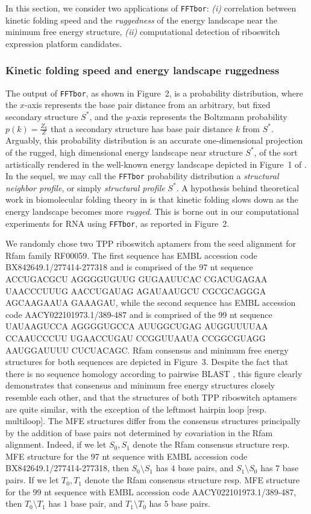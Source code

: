 In this section, we consider two applications of {\tt FFTbor}:
{\em (i)} correlation between kinetic folding speed and the {\em ruggedness}
of the energy landscape near the minimum free energy structure,
{\em (ii)} computational detection of riboswitch
expression platform candidates.

\subsubsection*{Kinetic folding speed and energy landscape ruggedness}

The output of {\tt FFTbor}, as shown in
Figure~2, is a probability distribution,
where the $x$-axis represents the base pair distance from an arbitrary,
but fixed secondary structure $S^*$, and the $y$-axis represents the
Boltzmann probability $p(k) = \frac{Z_k}{Z}$ that a secondary structure
has base pair distance $k$ from $S^*$. Arguably, this probability distribution
is an accurate one-dimensional projection of the rugged, high dimensional energy
landscape near structure $S^*$,
of the sort artistically rendered in the well-known
energy landscape depicted in Figure~1  of \cite{Wolynes.ptam05}.
In the sequel, we may call the {\tt FFTbor} probability distribution a
{\em structural neighbor profile}, or simply {\em structural profile}
$S^*$.
A hypothesis behind theoretical work in biomolecular folding theory in
\cite{Bryngelson.p95}
is that kinetic folding slows down as the energy landscape becomes more
{\em rugged}. This is borne out in our computational experiments for RNA
using {\tt FFTbor}, as reported
in Figure~2.

We randomly chose two TPP riboswitch
aptamers from the seed alignment for
Rfam family RF00059. The first sequence has EMBL accession code
BX842649.1/277414-277318 and is comprised of the 97 nt sequence
ACCUGACGCU AGGGGUGUUG GUGAAUUCAC CGACUGAGAA UAACCCUUUG AACCUGAUAG
AGAUAAUGCU CGCGCAGGGA AGCAAGAAUA GAAAGAU, while the second sequence
has EMBL accession code AACY022101973.1/389-487 and is comprised of the 99
nt sequence
UAUAAGUCCA AGGGGUGCCA AUUGGCUGAG AUGGUUUUAA CCAAUCCCUU
UGAACCUGAU CCGGUUAAUA CCGGCGUAGG AAUGGAUUUU CUCUACAGC.
Rfam consensus and minimum free energy structures for both sequences are
depicted in Figure~3.
Despite the fact that there is no sequence homology according to
pairwise BLAST \cite{BLAST}, this figure clearly demonstrates that
consensus and
minimum free energy structures closely resemble each other, and that the
structures of both TPP riboswitch aptamers are quite similar, with the
exception of the leftmost hairpin loop [resp. multiloop].
The MFE structures differ
from the consensus structures principally by the addition of base pairs not
determined by covariation in the Rfam alignment.
Indeed, if we let $S_0,S_1$
denote the Rfam consensus structure resp. MFE structure for the 97 nt
sequence with EMBL accession code BX842649.1/277414-277318, then
$S_0 \setminus S_1$ has $4$ base pairs, and $S_1\setminus S_0$ has $7$
base pairs. If we let $T_0,T_1$
denote the Rfam consensus structure resp. MFE structure for the 99 nt
sequence with EMBL accession code
AACY022101973.1/389-487, then
$T_0 \setminus T_1$ has $1$ base pair, and $T_1\setminus T_0$ has $5$
base pairs.

